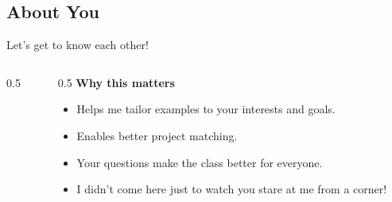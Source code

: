 \ifdefined\PRESENTATION\else\PassOptionsToClass{handout}{beamer}\fi\documentclass[aspectratio=169, lualatex]{beamer}
\begin{document}
\subsection{About You}

\begin{frame}{Let's get to know each other!}
	\begin{columns}[c]
		\begin{column}{0.5\textwidth}
		\end{column}
		\begin{column}{0.5\textwidth}
			\textbf{Why this matters}
			\begin{itemize}[<+->]
				\item Helps me tailor examples to your interests and goals.
				\item Enables better project matching.
				\item Your questions make the class better for everyone.
				\item I didn't come here just to watch you stare at me from a corner!
			\end{itemize}
		\end{column}
	\end{columns}
\end{frame}

\begin{frame}[plain]
	\titlepage
\end{frame}
\end{document}
